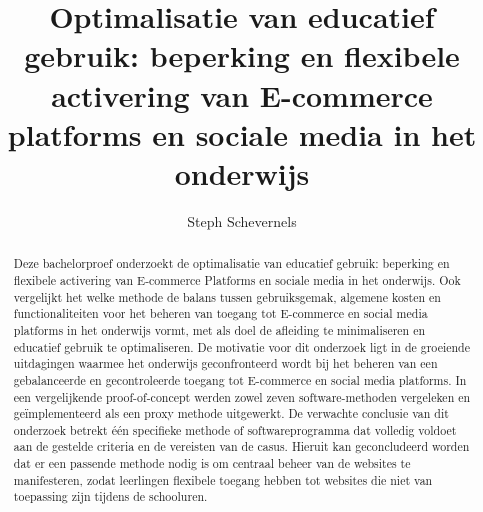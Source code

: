 \documentclass{hogent-article}
\title{Optimalisatie van educatief gebruik: beperking en flexibele activering van E-commerce platforms en sociale media in het onderwijs}
\author{Steph Schevernels}
\begin{document}
\begin{abstract}
   Deze bachelorproef onderzoekt de optimalisatie van educatief gebruik: beperking en flexibele activering van E-commerce Platforms en sociale media in het onderwijs. Ook vergelijkt het welke methode de balans tussen gebruiksgemak, algemene kosten en functionaliteiten voor het beheren van toegang tot E-commerce en social media platforms in het onderwijs vormt, met als doel de afleiding te minimaliseren en educatief gebruik te optimaliseren. De motivatie voor dit onderzoek ligt in de groeiende uitdagingen waarmee het onderwijs geconfronteerd wordt bij het beheren van een gebalanceerde en gecontroleerde toegang tot E-commerce en social media platforms. In een vergelijkende proof-of-concept werden zowel zeven software-methoden vergeleken en geïmplementeerd als een proxy methode uitgewerkt. De verwachte conclusie van dit onderzoek betrekt één specifieke methode of softwareprogramma dat volledig voldoet aan de gestelde criteria en de vereisten van de casus. Hieruit kan geconcludeerd worden dat er een passende methode nodig is om centraal beheer van de websites te manifesteren, zodat leerlingen flexibele toegang hebben tot websites die niet van toepassing zijn tijdens de schooluren.
\end{abstract}

\tableofcontents



\printbibliography[heading=bibintoc]
\end{document}
